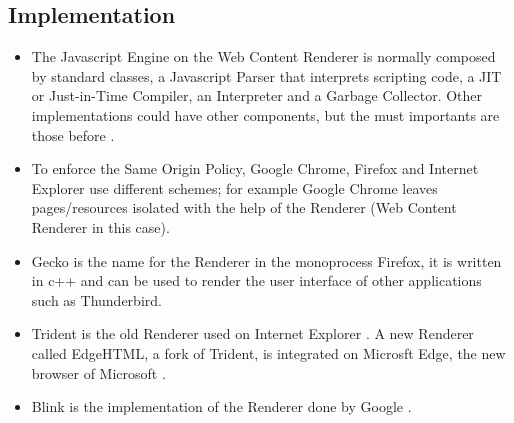 \documentclass{sig-alternate-05-2015}
\begin{document}
  \subsection*{Implementation}
  \begin{itemize}
    \item The Javascript Engine on the Web Content Renderer is normally composed by standard classes, a Javascript Parser that interprets scripting code, a JIT or Just-in-Time Compiler, an Interpreter and a Garbage Collector. Other implementations could have other components, but the must importants are those before \cite{GoogleChromeV8,MicrosoftChakra,MozillaSpidermonkey}.
    \item To enforce the Same Origin Policy, Google Chrome, Firefox and Internet Explorer use different schemes; for example Google Chrome leaves pages/resources isolated with the help of the Renderer (Web Content Renderer in this case).
    \item Gecko \cite{gecko2} is the name for the Renderer in the monoprocess Firefox, it is written in c++ and can be used to render the user interface of other applications such as Thunderbird.
    \item Trident is the old Renderer used on Internet Explorer \cite{Crowley2010}. A new Renderer called EdgeHTML, a fork of Trident, is integrated on Microsft Edge, the new browser of Microsoft \cite{edgehtml}.
    \item Blink is the implementation of the Renderer done by Google \cite{blink}.

  \end{itemize}
\end{document}
